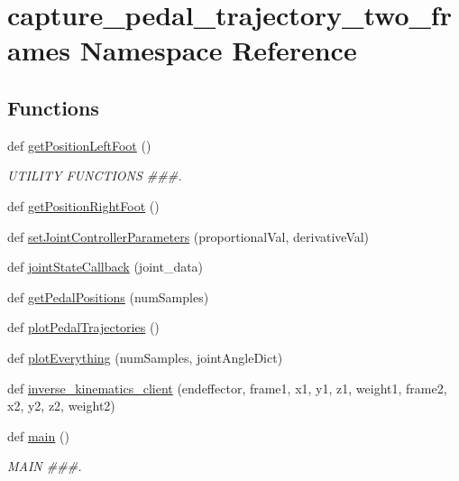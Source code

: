 \hypertarget{namespacecapture__pedal__trajectory__two__frames}{}\section{capture\+\_\+pedal\+\_\+trajectory\+\_\+two\+\_\+frames Namespace Reference}
\label{namespacecapture__pedal__trajectory__two__frames}
\subsection*{Functions}
\begin{DoxyCompactItemize}
\item 
def \mbox{\hyperlink{namespacecapture__pedal__trajectory__two__frames_ab05bc93a4f072761742af7a715c0dc6a}{get\+Position\+Left\+Foot}} ()
\begin{DoxyCompactList}\small\item\em U\+T\+I\+L\+I\+TY F\+U\+N\+C\+T\+I\+O\+NS \#\#\#. \end{DoxyCompactList}\item 
def \mbox{\hyperlink{namespacecapture__pedal__trajectory__two__frames_ace71d5b8ce6f0896550deef9afbaf6b7}{get\+Position\+Right\+Foot}} ()
\item 
def \mbox{\hyperlink{namespacecapture__pedal__trajectory__two__frames_a4795fc7e75acbffad570375277b990ce}{set\+Joint\+Controller\+Parameters}} (proportional\+Val, derivative\+Val)
\item 
def \mbox{\hyperlink{namespacecapture__pedal__trajectory__two__frames_ac4a584b22ff59cdb1722248eadb5e6ec}{joint\+State\+Callback}} (joint\+\_\+data)
\item 
def \mbox{\hyperlink{namespacecapture__pedal__trajectory__two__frames_a73a2a38c755efa1febad326d592bc146}{get\+Pedal\+Positions}} (num\+Samples)
\item 
def \mbox{\hyperlink{namespacecapture__pedal__trajectory__two__frames_a5a8839916fb243388efd9f8dc3a8213e}{plot\+Pedal\+Trajectories}} ()
\item 
def \mbox{\hyperlink{namespacecapture__pedal__trajectory__two__frames_a368a54e61888bc79d22fdf7e5453dd04}{plot\+Everything}} (num\+Samples, joint\+Angle\+Dict)
\item 
def \mbox{\hyperlink{namespacecapture__pedal__trajectory__two__frames_a531f122b71d703de15f006e3a975e618}{inverse\+\_\+kinematics\+\_\+client}} (endeffector, frame1, x1, y1, z1, weight1, frame2, x2, y2, z2, weight2)
\item 
def \mbox{\hyperlink{namespacecapture__pedal__trajectory__two__frames_af29edcf8d082bb626c92e061a0b39753}{main}} ()
\begin{DoxyCompactList}\small\item\em M\+A\+IN \#\#\#. \end{DoxyCompactList}\end{DoxyCompactItemize}
